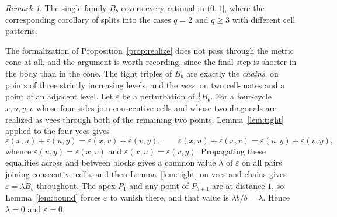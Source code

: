 \documentclass[11pt]{article}
\theoremstyle{definition}
\theoremstyle{remark}
\newtheorem{remark}[theorem]{Remark}
\newcommand{\eps}{\varepsilon}
\begin{document}
\begin{remark}\label{rem:bowtie-direct}
The single family $B_b$ covers every rational in $(0,1]$, where the corresponding corollary
of \cite{FK-cone} splits into the cases $q=2$ and $q\geq3$ with different cell patterns.

The formalization of Proposition~\ref{prop:realize} does not pass through the metric cone at
all, and the argument is worth recording, since the final step is shorter in the body than
in the cone. The tight triples of $B_b$ are exactly the \emph{chains}, on points of three
strictly increasing levels, and the \emph{vees}, on two cell-mates and a point of an
adjacent level. Let $\eps$ be a perturbation of $\tfrac1bB_b$. For a four-cycle $x,u,y,v$
whose four sides join consecutive cells and whose two diagonals are realized as vees through
both of the remaining two points, Lemma~\ref{lem:tight} applied to the four vees gives
\[
\eps(x,u)+\eps(u,y)=\eps(x,v)+\eps(v,y),
\qquad
\eps(x,u)+\eps(x,v)=\eps(u,y)+\eps(v,y),
\]
whence $\eps(u,y)=\eps(x,v)$ and $\eps(x,u)=\eps(v,y)$. Propagating these equalities across
and between blocks gives a common value $\lambda$ of $\eps$ on all pairs joining consecutive
cells, and then Lemma~\ref{lem:tight} on vees and chains gives $\eps=\lambda B_b$
throughout. The apex $P_1$ and any point of $P_{b+1}$ are at distance $1$, so
Lemma~\ref{lem:bound} forces $\eps$ to vanish there, and that value is $\lambda b/b=\lambda$.
Hence $\lambda=0$ and $\eps=0$.
\end{remark}
\end{document}
